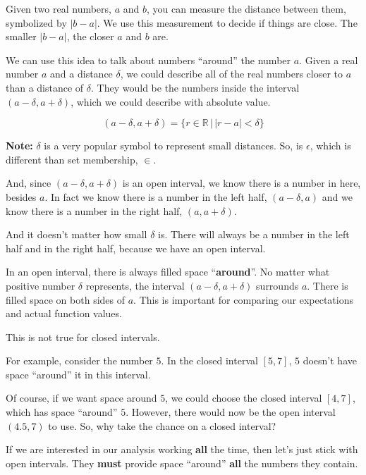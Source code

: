 \documentclass{ximera}
\begin{document}
Given two real numbers, $a$ and $b$, you can measure the distance between them, symbolized by $|b-a|$.  We use this measurement to decide if things are close.  The smaller $|b-a|$, the closer $a$ and $b$ are. 



We can use this idea to talk about numbers ``around'' the number $a$.  Given a real number $a$ and a distance $\delta$, we could describe all of the real numbers closer to $a$ than a distance of $\delta$.  They would be the numbers inside the interval $(a-\delta, a+\delta)$, which we could describe with absolute value.

\[      (a-\delta, a+\delta) = \{ r \in \mathbb{R} \, | \, |r - a| < \delta        \}       \]


\textbf{Note:}  $\delta$ is a very popular symbol to represent small distances.  So, is $\epsilon$, which is different than set membership, $\in$.



And, since $(a-\delta, a+\delta)$ is an open interval, we know there is a number in here, besides $a$.  In fact we know there is a number in the left half, $(a-\delta, a)$ and we know there is a number in the right half, $(a, a+\delta)$.


And it doesn't matter how small $\delta$ is.  There will always be a number in the left half and in the right half, because we have an open interval.


In an open interval, there is always filled space ``\textbf{\textcolor{purple!85!blue}{around}}''.  No matter what positive number $\delta$ represents, the interval $(a-\delta, a+\delta)$ surrounds $a$.  There is filled space on both sides of $a$. This is important for comparing our expectations and actual function values.





This is not true for closed intervals.


For example, consider the number $5$.  In the closed interval $[5, 7]$,  $5$ doesn't have space ``around'' it in this interval. 

Of course, if we want space around $5$, we could choose the closed interval $[4,7]$, which has space ``around'' $5$.  However, there would now be the open interval $(4.5, 7)$ to use.  So, why take the chance on a closed interval?  

If we are interested in our analysis working \textbf{\textcolor{red!70!black}{all}} the time, then let's just stick with open intervals.  They \textbf{must} provide space ``around'' \textbf{\textcolor{red!70!black}{all}} the numbers they contain. 
\end{document}
